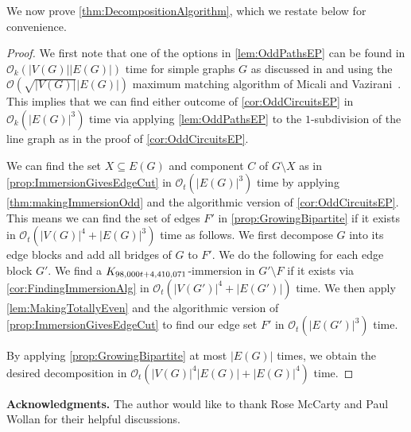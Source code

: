 \documentclass{article}
\theoremstyle{definition}
\begin{document}
We now prove \cref{thm:DecompositionAlgorithm}, which we restate below for convenience.

\DecompositionAlgorithmThm*
\begin{proof}
     We first note that one of the options in \cref{lem:OddPathsEP} can be found in $\mathcal{O}_k(|V(G)||E(G)|)$ time for simple graphs $G$ as discussed in \cite[Section~4]{Geelen2009oddMinor} and using the $\mathcal{O}(\sqrt{|V(G)|}|E(G)|)$ maximum matching algorithm of Micali and Vazirani~\cite{MicaliV1980algorithmfor}. This implies that we can find either outcome of \cref{cor:OddCircuitsEP} in $\mathcal{O}_k(|E(G)|^3)$ time via applying \cref{lem:OddPathsEP} to the $1$-subdivision of the line graph as in the proof of \cref{cor:OddCircuitsEP}.
     
    We can find the set $X \subseteq E(G)$ and component $C$ of $G \setminus X$ as in \cref{prop:ImmersionGivesEdgeCut} in $\mathcal{O}_t(|E(G)|^3)$ time by applying \cref{thm:makingImmersionOdd} and the algorithmic version of \cref{cor:OddCircuitsEP}. This means we can find the set of edges $F'$ in \cref{prop:GrowingBipartite} if it exists in $\mathcal{O}_t(|V(G)|^4 + |E(G)|^3)$ time as follows. We first decompose $G$ into its edge blocks and add all bridges of $G$ to $F'$. We do the following for each edge block $G'$. We find a $K_{98{\small,}000t + 4{\small,}410{\small,}071}$-immersion in $G' \setminus F$ if it exists via \cref{cor:FindingImmersionAlg} in $\mathcal{O}_t(|V(G')|^4 + |E(G')|)$ time. We then apply \cref{lem:MakingTotallyEven} and the algorithmic version of \cref{prop:ImmersionGivesEdgeCut} to find our edge set $F'$ in $\mathcal{O}_t(|E(G')|^3)$ time.
    
    By applying \cref{prop:GrowingBipartite} at most $|E(G)|$ times, we obtain the desired decomposition in $\mathcal{O}_t(|V(G)|^4|E(G)| + |E(G)|^4)$ time.
\end{proof}

\noindent
\textbf{Acknowledgments.}
The author would like to thank Rose McCarty and Paul Wollan for their helpful discussions.



\end{document}
